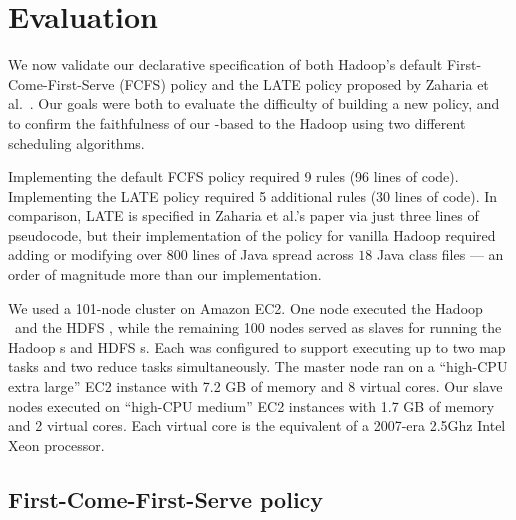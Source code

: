 \section{Evaluation}
\label{ch:boom:sec:eval}

We now validate our declarative specification of both Hadoop's default
First-Come-First-Serve (FCFS) policy and the LATE policy proposed by Zaharia et
al.~\cite{zaharia-late}. Our goals were both to evaluate the difficulty of
building a new policy, and to confirm the faithfulness of our \OVERLOG-based
{\JT} to the Hadoop {\JT} using two different scheduling algorithms.

Implementing the default FCFS policy required 9 rules (96 lines of
code). Implementing the LATE policy required 5 additional \OVERLOG rules (30
lines of code). In comparison, LATE is specified in Zaharia et al.'s paper via
just three lines of pseudocode, but their implementation of the policy for
vanilla Hadoop required adding or modifying over $800$ lines of Java spread 
across $18$ Java class files --- an order of magnitude more than our \OVERLOG implementation. 

We used a 101-node cluster on Amazon EC2. One node executed the Hadoop \JT\ 
and the HDFS \NN, while the remaining 100 nodes served as slaves for running the 
Hadoop {\TT}s and HDFS {\DN}s. Each {\TT} was configured to support executing up 
to two map tasks and two reduce tasks simultaneously. The master node ran on a 
``high-CPU extra large'' EC2 instance with 7.2 GB of memory and 8 virtual cores. 
Our slave nodes executed on ``high-CPU medium'' EC2 instances with 1.7 GB of 
memory and 2 virtual cores. Each virtual core is the equivalent of a 2007-era 2.5Ghz Intel Xeon
processor.


\subsection{First-Come-First-Serve policy}

